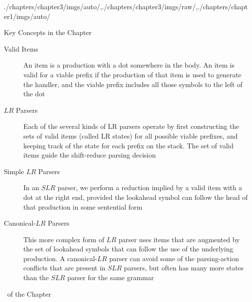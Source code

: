 \begin{graphicspathcontext}{{./chapters/chapter3/imgs/auto/},{./chapters/chapter3/imgs/raw/},{./chapters/chapter1/imgs/auto/}}
\begin{bibunit}[apalike]
\begin{frame}{{Key Concepts} in the Chapter \insertcontinuationtext}
\begin{small}
\begin{description}
	\item[Valid Items] An item is a production with a dot somewhere in the body. An item is valid for a viable prefix if the production of that item is used to generate the handler, and the viable prefix includes all those symbols to the left of the dot
	\item[$LR$ Parsers] Each of the several kinds of LR parsers operate by first constructing the sets of valid items (called LR states) for all possible viable prefixes, and keeping track of the state for each prefix on the stack. The set of valid items guide the shift-reduce parsing decision
	\item[Simple $LR$ Parsers] In an $SLR$ parser, we perform a reduction implied by a valid item with a dot at the right end, provided the lookahead symbol can follow the head of that production in some sentential form
	\item[Canonical-$LR$ Parsers] This more complex form of $LR$ parser uses items that are augmented by the set of lookahead symbols that can follow the use of the underlying production. A canonical-$LR$ parser can avoid some of the parsing-action conflicts that are present in $SLR$ parsers, but often has many more states than the $SLR$ parser for the same grammar
	\end{description}
	\end{small}
\end{frame}

\begin{frame}[t,fancyframetitle=false,allowframebreaks]{\bibname\ of the Chapter}%
	\tiny%
\end{frame}%

\end{bibunit}
\end{graphicspathcontext}
	
\endinput